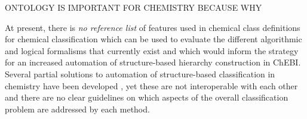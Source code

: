 \documentclass[10pt]{bmc_article}
\newenvironment{bmcformat}{\baselineskip20pt\sloppy\setboolean{publ}{false}}{\baselineskip20pt\sloppy}
\begin{document}
\begin{bmcformat}

ONTOLOGY IS IMPORTANT FOR CHEMISTRY BECAUSE WHY

At present, there is \textit{no reference list} of features used in chemical class definitions for chemical classification which can be used to evaluate the different algorithmic and logical formalisms that currently exist and which would inform the strategy for an increased automation of structure-based hierarchy construction in ChEBI. Several partial solutions to automation of structure-based classification in chemistry have been developed %
, yet these are not interoperable with each other and there are no clear guidelines on which aspects of the overall classification problem are addressed by each method. 


\end{bmcformat}
\end{document}
